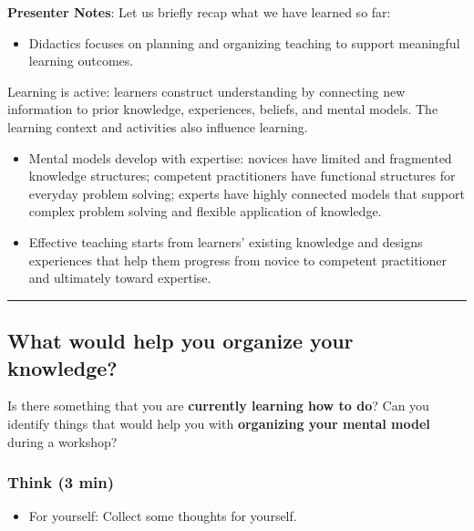 \documentclass[
  letterpaper,
  DIV=11,
  numbers=noendperiod]{scrartcl}
\providecommand{\tightlist}{%
  \setlength{\itemsep}{0pt}\setlength{\parskip}{0pt}}
\begin{document}
\textbf{Presenter Notes}: Let us briefly recap what we have learned so
far:

\begin{itemize}
\tightlist
\item
  Didactics focuses on planning and organizing teaching to support
  meaningful learning outcomes.
\end{itemize}

Learning is active: learners construct understanding by connecting new
information to prior knowledge, experiences, beliefs, and mental models.
The learning context and activities also influence learning.

\begin{itemize}
\item
  Mental models develop with expertise: novices have limited and
  fragmented knowledge structures; competent practitioners have
  functional structures for everyday problem solving; experts have
  highly connected models that support complex problem solving and
  flexible application of knowledge.
\item
  Effective teaching starts from learners' existing knowledge and
  designs experiences that help them progress from novice to competent
  practitioner and ultimately toward expertise.
\end{itemize}

\begin{center}\rule{0.5\linewidth}{0.5pt}\end{center}

\subsection{What would help you organize your
knowledge?}\label{what-would-help-you-organize-your-knowledge}

Is there something that you are \textbf{currently learning how to do}?
Can you identify things that would help you with \textbf{organizing your
mental model} during a workshop?

\subsubsection{Think (3 min)}\label{think-3-min}

\begin{itemize}
\tightlist
\item
  For yourself: Collect some thoughts for yourself.
\end{itemize}
\end{document}
